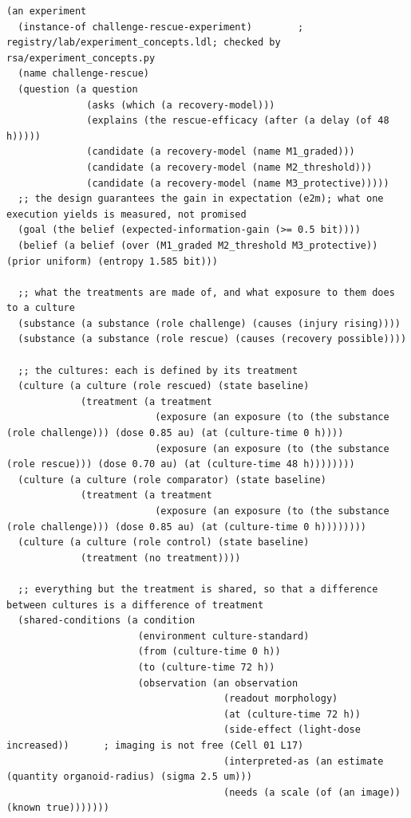 \documentclass[10pt,a4paper]{article}
\begin{document}
\begin{Verbatim}[fontsize=\tiny,breaklines,frame=lines,framesep=2mm]
(an experiment
  (instance-of challenge-rescue-experiment)        ; registry/lab/experiment_concepts.ldl; checked by rsa/experiment_concepts.py
  (name challenge-rescue)
  (question (a question
              (asks (which (a recovery-model)))
              (explains (the rescue-efficacy (after (a delay (of 48 h)))))
              (candidate (a recovery-model (name M1_graded)))
              (candidate (a recovery-model (name M2_threshold)))
              (candidate (a recovery-model (name M3_protective)))))
  ;; the design guarantees the gain in expectation (e2m); what one execution yields is measured, not promised
  (goal (the belief (expected-information-gain (>= 0.5 bit))))
  (belief (a belief (over (M1_graded M2_threshold M3_protective)) (prior uniform) (entropy 1.585 bit)))

  ;; what the treatments are made of, and what exposure to them does to a culture
  (substance (a substance (role challenge) (causes (injury rising))))
  (substance (a substance (role rescue) (causes (recovery possible))))

  ;; the cultures: each is defined by its treatment
  (culture (a culture (role rescued) (state baseline)
             (treatment (a treatment
                          (exposure (an exposure (to (the substance (role challenge))) (dose 0.85 au) (at (culture-time 0 h))))
                          (exposure (an exposure (to (the substance (role rescue))) (dose 0.70 au) (at (culture-time 48 h))))))))
  (culture (a culture (role comparator) (state baseline)
             (treatment (a treatment
                          (exposure (an exposure (to (the substance (role challenge))) (dose 0.85 au) (at (culture-time 0 h))))))))
  (culture (a culture (role control) (state baseline)
             (treatment (no treatment))))

  ;; everything but the treatment is shared, so that a difference between cultures is a difference of treatment
  (shared-conditions (a condition
                       (environment culture-standard)
                       (from (culture-time 0 h))
                       (to (culture-time 72 h))
                       (observation (an observation
                                      (readout morphology)
                                      (at (culture-time 72 h))
                                      (side-effect (light-dose increased))      ; imaging is not free (Cell 01 L17)
                                      (interpreted-as (an estimate (quantity organoid-radius) (sigma 2.5 um)))
                                      (needs (a scale (of (an image)) (known true)))))))


\end{Verbatim}
\end{document}
